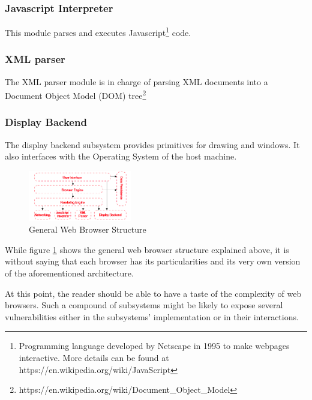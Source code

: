 \documentclass[journal]{IEEEtran}
\begin{document}
\subsubsection{Javascript Interpreter}
This module parses and executes Javascript\footnote{Programming language developed by Netscape in 1995 to make webpages interactive. More details can be found at https://en.wikipedia.org/wiki/JavaScript} code.

\subsubsection{XML parser}
The XML parser module is in charge of parsing XML documents into a Document Object Model (DOM) tree\footnote{https://en.wikipedia.org/wiki/Document\_Object\_Model}

\subsubsection{Display Backend}
The display backend subsystem provides primitives for drawing and windows. It also interfaces with the Operating System of the host machine.

\begin{figure}[h]
\centering
\includegraphics[width=0.4\textwidth]{images/BrowserStructure.png}
\caption{General Web Browser Structure}
\label{fig:browserStructure}
\end{figure}

While figure \ref{fig:browserStructure} shows the general web browser structure explained above, it is without saying that each browser has its particularities and its very own version of the aforementioned architecture.

\medskip

At this point, the reader should be able to have a taste of the complexity of web browsers. Such a compound of subsystems might be likely to expose several vulnerabilities either in the subsystems' implementation or in their interactions.
\end{document}
